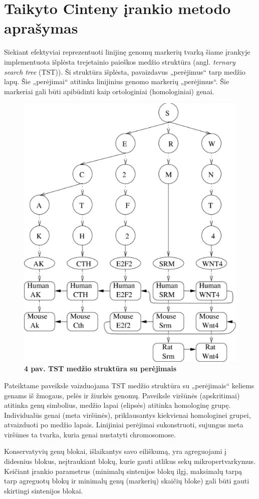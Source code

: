 \documentclass[12pt]{article}
\begin{document}
\newpage


\section{Taikyto \textbf{Cinteny} įrankio metodo aprašymas}
Siekiant efektyviai reprezentuoti linijinę genomų markerių tvarką šiame įrankyje
implementuota išplėsta trejetainio paieškos medžio struktūra (angl.
\emph{ternary search tree} (TST)). Ši struktūra išplėsta, pavaizdavus
„perėjimus“ tarp medžio lapų. Šie „perėjimai“ atitinka linijinius genomo
markerių „perėjimus“. Šie markeriai gali būti apibūdinti kaip ortologiniai
(homologiniai) genai.

\begin{figure}[htb]
    \begin{center}
        \includegraphics[width=0.4\linewidth]{../Figures/TTS_data_structure.png}
        \vspace{-0.5\baselineskip}
        \caption*{\small\textbf{4 pav. TST medžio struktūra su perėjimais}}
        \label{fig:birds}
    \end{center}
\end{figure}

Pateiktame paveiksle vaizduojama TST medžio struktūra su „perėjimais“ keliems
genams iš žmogaus, pelės ir žiurkės genomų. Paveiksle viršūnės (apskritimai)
atitinka genų simbolius, medžio lapai (elipsės) atitinka homologinę grupę.
Individualūs genai (meta viršūnės), priklausantys kiekvienai homologinei
grupei, atvaizduoti po medžio lapais. Linijiniai perėjimai sukonstruoti,
sujungus meta viršūnes ta tvarka, kuria genai nustatyti chromosomose.

Konservatyvių genų blokai, išlaikantys savo eiliškumą, yra agreguojami į
didesnius blokus, neįtraukiant blokų, kurie gauti atlikus sekų
mikropertvarkymus. Keičiant įrankio parametrus (minimalų sintenijos blokų
ilgį, maksimalų tarpą tarp agreguotų blokų ir minimalų genų (markerių) skaičių
bloke) gali būti gauti skirtingi sintenijos blokai.
\end{document}
